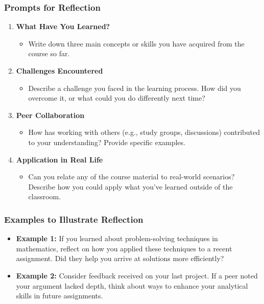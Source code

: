 \documentclass[aspectratio=169]{beamer}
\begin{document}
\begin{frame}[fragile]
    \frametitle{Prompts for Reflection}
    \begin{enumerate}
        \item \textbf{What Have You Learned?}
            \begin{itemize}
                \item Write down three main concepts or skills you have acquired from the course so far.
            \end{itemize}

        \item \textbf{Challenges Encountered}
            \begin{itemize}
                \item Describe a challenge you faced in the learning process. How did you overcome it, or what could you do differently next time?
            \end{itemize}

        \item \textbf{Peer Collaboration}
            \begin{itemize}
                \item How has working with others (e.g., study groups, discussions) contributed to your understanding? Provide specific examples.
            \end{itemize}

        \item \textbf{Application in Real Life}
            \begin{itemize}
                \item Can you relate any of the course material to real-world scenarios? Describe how you could apply what you’ve learned outside of the classroom.
            \end{itemize}
    \end{enumerate}
\end{frame}

\begin{frame}[fragile]
    \frametitle{Examples to Illustrate Reflection}
    \begin{itemize}
        \item \textbf{Example 1:} 
          If you learned about problem-solving techniques in mathematics, reflect on how you applied these techniques to a recent assignment. Did they help you arrive at solutions more efficiently?
          
        \item \textbf{Example 2:} 
          Consider feedback received on your last project. If a peer noted your argument lacked depth, think about ways to enhance your analytical skills in future assignments.
    \end{itemize}
\end{frame}
\end{document}
